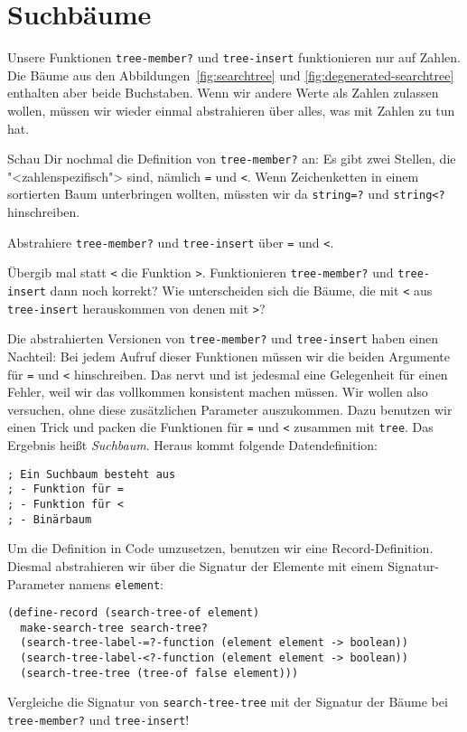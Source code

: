\section{Suchbäume}
\label{sec:suchbaeume}

Unsere Funktionen \lstinline{tree-member?} und \lstinline{tree-insert}
funktionieren nur auf Zahlen. Die Bäume aus den
Abbildungen~\ref{fig:searchtree} und \ref{fig:degenerated-searchtree}
enthalten aber beide Buchstaben.  Wenn wir andere Werte als Zahlen
zulassen wollen, müssen wir wieder einmal abstrahieren über alles, was
mit Zahlen zu tun hat.

Schau Dir nochmal die Definition von \lstinline{tree-member?} an: Es
gibt zwei Stellen, die "<zahlenspezifisch"> sind, nämlich
\lstinline{=} und \lstinline{<}.  Wenn Zeichenketten in einem
sortierten Baum unterbringen wollten, müssten wir da
\lstinline{string=?} und \lstinline{string<?} hinschreiben.

\begin{aufgabeinline}
  Abstrahiere \lstinline{tree-member?} und \lstinline{tree-insert}
  über \lstinline{=} und \lstinline{<}.

  Übergib mal statt \lstinline{<} die Funktion \lstinline{>}.
  Funktionieren \lstinline{tree-member?} und \lstinline{tree-insert}
  dann noch korrekt?  Wie unterscheiden sich die Bäume, die mit
  \lstinline{<} aus \lstinline{tree-insert} herauskommen von denen mit
  \lstinline{>}?
\end{aufgabeinline}

Die abstrahierten Versionen von \lstinline{tree-member?} und
\lstinline{tree-insert} haben einen Nachteil: Bei jedem Aufruf dieser
Funktionen müssen wir die beiden Argumente für \lstinline{=} und
\lstinline{<} hinschreiben.  Das nervt und ist jedesmal eine
Gelegenheit für einen Fehler, weil wir das vollkommen konsistent
machen müssen.
Wir wollen also versuchen, ohne diese zusätzlichen Parameter
auszukommen.  Dazu benutzen wir einen Trick und packen die Funktionen
für \lstinline{=} und \lstinline{<} zusammen mit \lstinline{tree}.
Das Ergebnis heißt \textit{Suchbaum}.  Heraus kommt
folgende Datendefinition:
%
\begin{lstlisting}
; Ein Suchbaum besteht aus
; - Funktion für =
; - Funktion für <
; - Binärbaum
\end{lstlisting}
%
Um die Definition in Code umzusetzen, benutzen wir eine
Record-Definition.  Diesmal abstrahieren wir über die Signatur der
Elemente mit einem Signatur-Parameter namens \lstinline{element}:\label{func:search-tree-of}
%
\begin{lstlisting}
(define-record (search-tree-of element)
  make-search-tree search-tree?
  (search-tree-label-=?-function (element element -> boolean))
  (search-tree-label-<?-function (element element -> boolean))
  (search-tree-tree (tree-of false element)))
\end{lstlisting}
%
Vergleiche die Signatur von \lstinline{search-tree-tree} mit der
Signatur der Bäume bei \lstinline{tree-member?} und
\lstinline{tree-insert}!

